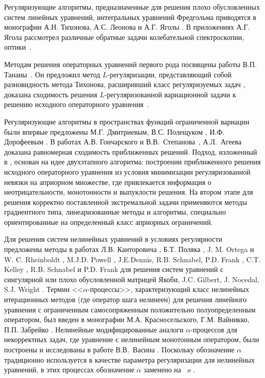 {Регуляризующие алгоритмы, предназначенные для решения плохо обусловленных систем линейных уравнений, интегральных уравнений Фредгольма приводятся в монографии А.Н. Тихонова, А.С. Леонова и А.Г. Яголы \cite{TihLeoYag2017}. В приложениях А.Г. Ягола рассмотрел различные обратные задачи колебательной спектроскопии, оптики~\cite{KliKosLiYag2016,LukYag2016,IsaLukTihYag2017,KocKurPenYag2017}.

Методам решения операторных уравнений первого рода посвящены работы В.П. Тананы~\cite{Tan1977, Tan1997, Tan1981}. Он предложил метод $L$-регуляризации, представляющий собой разновидность метода Тихонова, расширивший класс регуляризуемых задач \cite{Tan2003_1,Tan2003_2}, доказана сходимость решения $L$-регуляризованной вариационной задачи к решению исходного операторного уравнения~\cite{Tan2003_2}.

Регуляризующие алгоритмы в пространствах функций ограниченной вариации были впервые предложены М.Г. Дмитриевым, В.С. Полещуком \cite{DmiPol1972}, И.Ф. Дорофеевым \cite{Dor1979}. В работах А.В. Гончарского и В.В.~Степанова~\cite{GonSte1979}, А.Л.~Агеева~\cite{Ag1980} доказана равномерная сходимость приближенных решений. Подход, изложенный в \cite{TikhGonSteYag1990}, основан на идее двухэтапного алгоритма: построении приближенного решения  исходного операторного уравнения из условия минимизации регуляризованной невязки на априорном множестве, где привлекается информация о неотрицательности, монотонности и выпуклости решения. 
На втором этапе для решения корректно поставленной экстремальной задачи применяются методы градиентного типа, линеаризованные методы и алгоритмы, специально ориентированные на определенный класс априорных ограничений.

Для решения систем нелинейных уравнений в условиях регулярности предложены методы в работах Л.В. Канторовича \cite{Kan1947}, Б.Т. Поляка \cite{Pol1969}, J. M. Ortega и W. C. Rheinboldt \cite{OrtRhe1970}, M.J.D. Powell \cite{Pow1970}, J.E.Dennis, R.B. Schnabel, P.D. Frank \cite{DenSchn1996}, C.T. Kelley \cite{Kel1995}, R.B. Schnabel и P.D. Frank \cite{SchnFra1983} для решения систем уравнений с сингулярной или плохо обусловленной матрицей Якоби, J.C. Gilbert, J. Nocedal, S.J. Wright \cite{GilNoc1991, NocWri2006}. Термин <<$\alpha$-процессы>>, характеризующий класс нелинейных итерационных методов (где оператор шага нелинеен) для решения линейного уравнения с ограниченным самосопряженным положительно полуопределенным оператором, был введен в монографии М.А. Красносельского, Г.М. Вайникко, П.П. Забрейко \cite{KraVayZab1969}. %
Нелинейные модифицированные аналоги $\alpha$-процессов для некорректных задач, где уравнение с нелинейным монотонным оператором, были построены и исследованы в работе В.В.~Васина \cite{Vasin2016}. Поскольку обозначение $\alpha$ традиционно используется в качестве параметра регуляризации для нелинейных уравнений, в этих процессах обозначение $\alpha$ заменено на~$\varkappa$.

}
